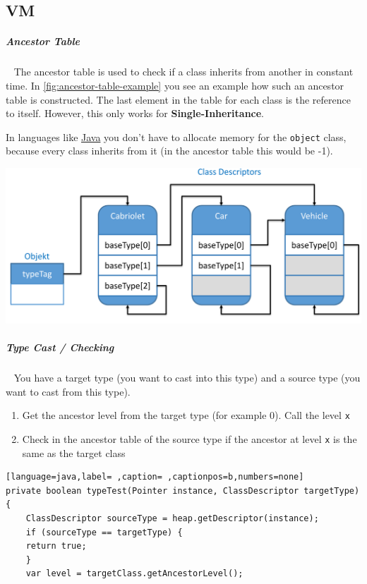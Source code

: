 \documentclass[12pt,twoside,landscape]{extarticle}
\begin{document}
\begin{multicols}{4}
\section{VM}
\label{sec:org02450a3}
\subparagraph{Ancestor Table} \
\label{sec:orgf678f0a}
The ancestor table is used to check if a class inherits from another in constant time.
In \autoref{fig:ancestor-table-example} you see an example how such an ancestor table is constructed.
The last element in the table for each class is the reference to itself.
However, this only works for \textbf{Single-Inheritance}.

In languages like \href{../../../roam/20201116150053-java.org}{Java} you don't have to allocate memory for the \texttt{object} class, because every class inherits from it (in the ancestor table this would be -1).

{
\begin{center}
\includegraphics[width=.9\linewidth]{img/ancestor_table.png}
\end{center}
\label{fig:ancestor-table-example}
}

\subparagraph{Type Cast / Checking} \
\label{sec:org61e8d2c}
You have a target type (you want to cast into this type) and a source type (you want to cast from this type).

\begin{enumerate}
\item Get the ancestor level from the target type (for example 0). Call the level \texttt{x}
\item Check in the ancestor table of the source type if the ancestor at level \texttt{x} is the same as the target class
\end{enumerate}


\begin{lstlisting}[language=java,label= ,caption= ,captionpos=b,numbers=none]
private boolean typeTest(Pointer instance, ClassDescriptor targetType) {
    ClassDescriptor sourceType = heap.getDescriptor(instance);
    if (sourceType == targetType) {
	return true;
    }
    var level = targetClass.getAncestorLevel();


\end{lstlisting}
\end{multicols}
\end{document}
